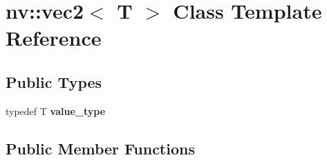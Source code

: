 \hypertarget{classnv_1_1vec2}{}\section{nv\+:\+:vec2$<$ T $>$ Class Template Reference}
\label{classnv_1_1vec2}
\subsection*{Public Types}
\begin{DoxyCompactItemize}
\item 
\hypertarget{classnv_1_1vec2_a3d3474ed0b0c4f8cbe07a262ced84b63}{}\label{classnv_1_1vec2_a3d3474ed0b0c4f8cbe07a262ced84b63} 
typedef T {\bfseries value\+\_\+type}
\end{DoxyCompactItemize}
\subsection*{Public Member Functions}
